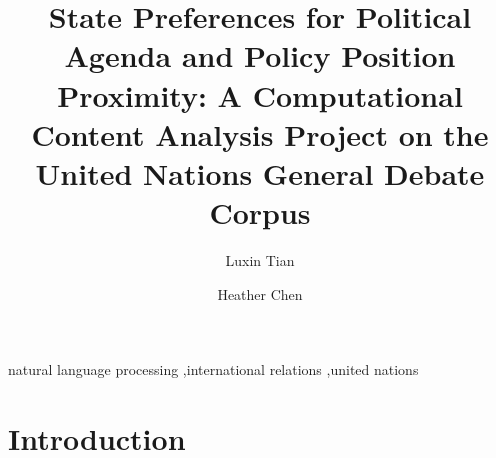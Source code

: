 \documentclass[final,authoryear,3p,12pt,times,hidelinks]{elsarticle}
\begin{document}
\begin{frontmatter}



\title{State Preferences for Political Agenda and Policy Position Proximity: A Computational Content Analysis Project on the United Nations General Debate Corpus}

\author{Luxin Tian}
\author{Heather Chen} 
\address{
  MA Program in Computational Social Science\\
  The University of Chicago
}


\author{}


\begin{abstract}

\end{abstract}

\begin{keyword}
natural language processing \sep international relations \sep united nations

\end{keyword}

\end{frontmatter}





\section{Introduction}
\end{document}

